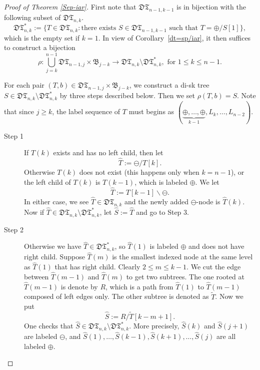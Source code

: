\documentclass[11pt,reqno]{amsart}
\numberwithin{equation}{section}
\theoremstyle{plain}
\theoremstyle{definition}
\newcommand{\B}{\mathcal{B}}
\newcommand{\I}{\mathfrak{B}}
\def\DT{\mathfrak{DT}}
\begin{document}
\begin{proof}[Proof of Theorem \ref{Sep-iar}]First note that $\mathfrak{DT}_{n-1,k-1}$ is in bijection with the following subset of $\mathfrak{DT}_{n,k}$.
$$\mathfrak{DT}_{n,k}^*:=\{T\in\DT_{n,k}: \text{there exists $S\in\DT_{n-1,k-1}$ such that $T=\oplus\slash S[1]$}\},$$
which is the empty set if $k=1$. In view of Corollary~\ref{dt=sp/iar}, it then suffices to construct a bijection $$\rho:\bigcup_{j=k}^{n-1}\DT_{n-1,j}\times\I_{j-k}\rightarrow \DT_{n,k}\setminus \DT_{n,k}^*, \text{ for $1\le k\le n-1$}.$$


For each pair $(T,b)\in\DT_{n-1,j}\times\I_{j-k}$, we construct a di-sk tree $S\in\mathfrak{DT}_{n,k}\setminus\DT_{n,k}^*$ by three steps described below. Then we set $\rho(T,b)=S$. Note that since $j\ge k$, the label sequence of $T$ must begins as $(\underbrace{\oplus,\ldots,\oplus}_{k-1},L_k,\ldots,L_{n-2})$.

\begin{description}
\item[Step 1] If $T(k)$ exists and has no left child, then let $$\hat{T}:=\ominus\slash T[k].$$ Otherwise $T(k)$ does not exist (this happens only when $k=n-1$), or the left child of $T(k)$ is $T(k-1)$, which is labeled $\oplus$. We let $$\hat{T}:=T[k-1]\backslash\ominus.$$ In either case, we see $\hat{T}\in\DT_{n,k}$ and the newly added $\ominus$-node is $\hat{T}(k)$. Now if $\hat{T}\in\DT_{n,k}\setminus \DT_{n,k}^*$, let $\hat{S}:=\hat{T}$ and go to Step 3.

\item[Step 2] Otherwise we have $\hat{T}\in\DT_{n,k}^*$, so $\hat{T}(1)$ is labeled $\oplus$ and does not have right child. Suppose $\hat{T}(m)$ is the smallest indexed node at the same level as $\hat{T}(1)$ that has right child. Clearly $2\le m \le k-1$. We cut the edge between $\hat{T}(m-1)$ and $\hat{T}(m)$ to get two subtrees. The one rooted at $\hat{T}(m-1)$ is denote by $R$, which is a path from $\hat{T}(1)$ to $\hat{T}(m-1)$ composed of left edges only. The other subtree is denoted as $\tilde{T}$. Now we put $$\hat{S}:=R\slash\tilde{T}[k-m+1].$$ One checks that $\hat{S}\in\DT_{n,k}\setminus \DT_{n,k}^*$. More precisely, $\hat{S}(k)$ and $\hat{S}(j+1)$ are labeled $\ominus$, and $\hat{S}(1),\ldots,\hat{S}(k-1),\hat{S}(k+1),\ldots,\hat{S}(j)$ are all labeled $\oplus$.


\end{description}
\end{proof}
\end{document}
